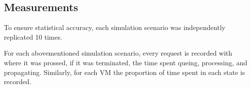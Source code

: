 \subsection{Measurements}
To ensure statistical accuracy, each simulation scenario was independently replicated 10 times.

For each abovementioned simulation scenario, every request is recorded with where it was prossed, if it was terminated, the time spent queing, processing, and propagating. Similarly, for each VM the proportion of time spent in each state is recorded.